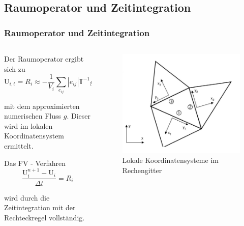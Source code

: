 \documentclass[
	11pt, %
	aspectratio=169, %
]{beamer}
\begin{document}
\subsection{Raumoperator und Zeitintegration}
\begin{frame}
	\frametitle{Raumoperator und Zeitintegration}
	\begin{columns}[c] %
		\begin{column}{0.6\textwidth} %
			Der Raumoperator ergibt sich zu
			\begin{equation}
				\mathrm{U}_{i,t} = R_i \approx -\frac{1}{V_i} \sum\limits_{e_{ij}}^{} |e_{ij}| \mathbb{T}^{-1} g(\mathbb{T}\mathrm{U}_i,\: \mathbb{T}\mathrm(U)_j; \: [1,0]^T)
			\end{equation}
		
			mit dem approximierten numerischen Fluss $g$. Dieser wird im lokalen Koordinatensystem ermittelt.
			
		
			Das FV - Verfahren
			\begin{equation}
				\frac{\mathrm{U}_i^{n+1}-\mathrm{U}_i}{\Delta t} = R_i
			\end{equation}
		
			wird durch die Zeitintegration mit der Rechteckregel vollständig.
		\end{column}
		\begin{column}{0.35\textwidth} %
			\vspace*{-1cm}
			\begin{figure}
				\includegraphics[width=1.1\linewidth]{local_global.JPG}
				\caption{Lokale Koordinatensysteme im Rechengitter}
			\end{figure}
		\end{column}
	\end{columns}
	
	
	
 


\end{frame}
\end{document}
